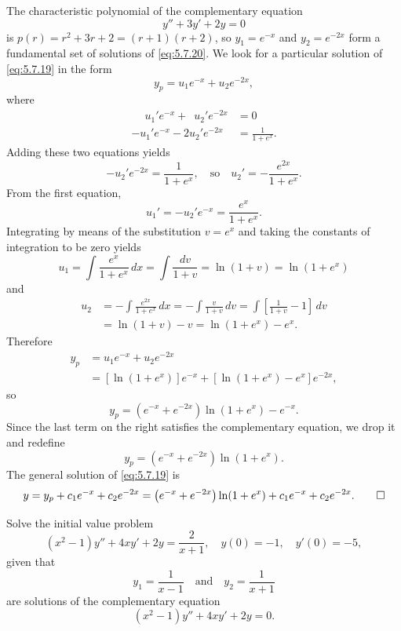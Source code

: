 \begin{solution}
The characteristic polynomial of the complementary equation
\begin{equation} \label{eq:5.7.20}
y''+3y'+2y=0
\end{equation}
is $p(r)=r^2+3r+2=(r+1)(r+2)$, so
$y_1=e^{-x}$ and $y_2=e^{-2x}$ form a fundamental set of solutions of
\eqref{eq:5.7.20}.  We look for a particular solution of
\eqref{eq:5.7.19} in the form
\[
y_p=u_1e^{-x}+u_2e^{-2x},
\]
where
\begin{align*}
\phantom{-}u_1'e^{-x}+\phantom{2}u_2'e^{-2x}&=0\\
-u_1'e^{-x}-2u_2'e^{-2x}&=\frac{1}{1+e^x}.
\end{align*}
Adding these two equations yields
\[
-u_2'e^{-2x}=\frac{1}{1+e^x},\quad\text{so}\quad
u_2'=-\frac{e^{2x}}{1+e^x}.
 \]
From the first equation,
\[
u_1'=-u_2'e^{-x}=\frac{e^x}{1+e^x}.
\]
Integrating by means of  the substitution $v=e^x$ and taking the
constants of integration to be zero  yields
 \[
u_1=\int\frac{e^x}{1+e^x}\,dx=\int \frac{dv}{1+v}
=\ln(1+v)=\ln(1+e^x)
\]
and
\begin{align*}
u_2&=-\int\frac{e^{2x}}{1+e^x}\,dx=-\int \frac{v}{1+v}\,dv
=\int\left[\frac{1}{1+v}-1\right]\,dv \\
&=\ln(1+v)-v=\ln(1+e^x)-e^x.
\end{align*}
Therefore
\begin{align*}
y_p&=u_1e^{-x}+u_2e^{-2x}\\
&=[\ln(1+e^x)]e^{-x}+\left[\ln(1+e^x)-e^x\right]e^{-2x},
\end{align*}
so
\[
y_p=\left(e^{-x}+e^{-2x}\right)\ln(1+e^x)-e^{-x}.
\]
Since the last term on the right satisfies  the complementary
equation, we drop it and redefine
\[
y_p=\left(e^{-x}+e^{-2x}\right)\ln(1+e^x).
\]
The general solution of
 \eqref{eq:5.7.19} is
\[
y=y_p+c_1e^{-x}+c_2e^{-2x}=\left(e^{-x}+e^{-2x}\right)\ln(1+e^x)
+c_1e^{-x}+c_2e^{-2x}.\qedhere
\]
\end{solution}

\begin{example}\label{example:5.7.4}
Solve the initial value problem
\begin{equation} \label{eq:5.7.21}
(x^2-1)y''+4xy'+2y=\frac{2}{x+1}, \quad  y(0)=-1,\quad y'(0)=-5,
\end{equation}
 given that
\[
y_1=\frac{1}{x-1}\quad\text{and}\quad y_2=\frac{1}{x+1}
\]
are  solutions of the complementary
equation
\[
(x^2-1)y''+4xy'+2y=0.
\]
\end{example}

